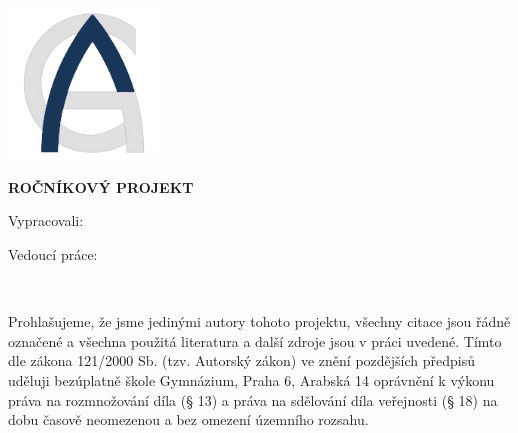 
\pagestyle{empty}
\hypersetup{pageanchor=false}

\begin{center}

{\LARGE\bfseries\NazevSkoly}

\vspace{-18mm}
\vfill

{\LARGE\NazevOboru}

\vfill

\centerline{\mbox{\includegraphics[height=4cm]{../img/logo.png}}}

\vspace{-8mm}
\vfill

{\bf\Large ROČNÍKOVÝ PROJEKT}

\vfill


\vspace{15mm}

{\LARGE\bfseries\NazevPrace}


\vfill


Vypracovali: \hfill \AutorPrace

Vedoucí práce: \hfill \Vedouci

\vspace{15mm}
\MesicOdevzdani \ \RokOdevzdani

\end{center}



\newpage
\hypersetup{pageanchor=true}
\pagestyle{plain}


\openright


\vspace*{\fill}


\noindent
Prohlašujeme, že jsme jedinými autory tohoto projektu, všechny citace jsou
řádně označené a všechna použitá literatura a další zdroje jsou v práci uvedené.
Tímto dle zákona 121/2000 Sb. (tzv. Autorský zákon) ve znění pozdějších předpisů uděluji
bezúplatně škole Gymnázium, Praha 6, Arabská 14 oprávnění k výkonu práva na rozmnožování díla
(§ 13) a práva na sdělování díla veřejnosti (§ 18) na dobu časově neomezenou a bez omezení
územního rozsahu.


